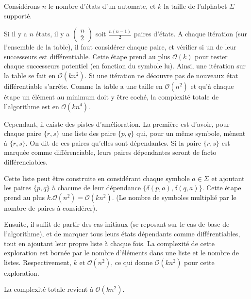 \begin{complexity}

Considérons $n$ le nombre d'états d'un automate, et $k$ la taille de l'alphabet $\Sigma$ supporté.

Si il y a $n$ états, il y a $\begin{pmatrix}n\\2\end{pmatrix}$ soit $\frac{n(n-1)}{2}$ paires d'états. A chaque itération (sur l'ensemble de la table), il faut considérer chaque paire, et vérifier si un de leur successeurs est différentiable. Cette étape prend au plus $\mathcal{O}(k)$ pour tester chaque successeurs potentiel (en fonction du symbole lu).  Ainsi, une itération sur la table se fait en $\mathcal{O}(kn^2)$. Si une itération ne découvre pas de nouveaux état différentiable s'arrête. Comme la table a une taille en $\mathcal{O}(n^2)$ et qu'à chaque étape un élément au minimum doit y être coché, la complexité totale de l'algorithme est en $\mathcal{O}(kn^4)$.

Cependant, il existe des pistes d'amélioration. La première est d'avoir, pour chaque paire $\{r,s\}$ une liste des paire $\{p,q\}$ qui, pour un même symbole, mènent à $\{r,s\}$. On dit de ces paires qu'elles sont dépendantes. Si la paire $\{r,s\}$ est marquée comme différenciable, leurs paires dépendantes seront de facto différenciables.

Cette liste peut être construite en considérant chaque symbole $a \in \Sigma$ et ajoutant les paires $\{p,q\}$ à chacune de leur dépendance $\{\delta(p,a),\delta(q,a)\}$. Cette étape prend au plus $k.\mathcal{O}(n^2)=\mathcal{O}(kn^2)$. (Le nombre de symboles multiplié par le nombre de paires à considérer).

Ensuite, il suffit de partir des cas initiaux (se reposant sur le cas de base de l'algorithme), et de marquer tous leurs états dépendants comme différentiables, tout en ajoutant leur propre liste à chaque fois. La complexité de cette exploration est bornée par le nombre d'éléments dans une liste et le nombre de listes. Respectivement, $k$ et $\mathcal{O}(n^2)$, ce qui donne $\mathcal{O}(kn^2)$ pour cette exploration.

La complexité totale revient à $\mathcal{O}(kn^2)$.
\end{complexity}



